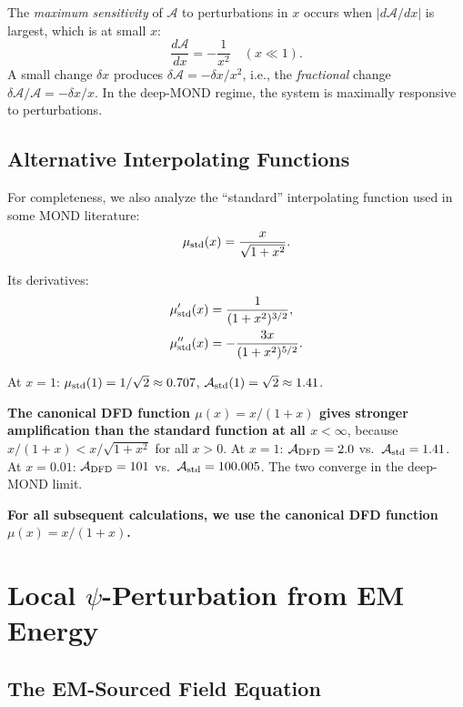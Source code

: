 \documentclass[aps,prd,twocolumn,superscriptaddress,nofootinbib]{revtex4-2}
\begin{document}
The \emph{maximum sensitivity} of $\mathcal{A}$ to perturbations in $x$
occurs when $|d\mathcal{A}/dx|$ is largest, which is at small $x$:
\begin{equation}
\frac{d\mathcal{A}}{dx} = -\frac{1}{x^2} \quad (x \ll 1).
\end{equation}
A small change $\delta x$ produces $\delta\mathcal{A} = -\delta x/x^2$,
i.e., the \emph{fractional} change $\delta\mathcal{A}/\mathcal{A} =
-\delta x/x$.  In the deep-MOND regime, the system is maximally
responsive to perturbations.

\subsection{Alternative Interpolating Functions}

For completeness, we also analyze the ``standard'' interpolating function
used in some MOND literature:
\begin{equation}
\mu_{\rm std}(x) = \frac{x}{\sqrt{1+x^2}}.
\end{equation}

Its derivatives:
\begin{align}
\mu_{\rm std}'(x) &= \frac{1}{(1+x^2)^{3/2}}, \\
\mu_{\rm std}''(x) &= -\frac{3x}{(1+x^2)^{5/2}}.
\end{align}

At $x = 1$: $\mu_{\rm std}(1) = 1/\sqrt{2} \approx 0.707$,
$\mathcal{A}_{\rm std}(1) = \sqrt{2} \approx 1.41$.

\textbf{The canonical DFD function $\mu(x) = x/(1+x)$ gives stronger
amplification than the standard function at all $x < \infty$}, because
$x/(1+x) < x/\sqrt{1+x^2}$ for all $x > 0$.  At $x = 1$:
$\mathcal{A}_{\rm DFD} = 2.0$ vs.\ $\mathcal{A}_{\rm std} = 1.41$.
At $x = 0.01$: $\mathcal{A}_{\rm DFD} = 101$ vs.\
$\mathcal{A}_{\rm std} = 100.005$.  The two converge in the deep-MOND limit.

\textbf{For all subsequent calculations, we use the canonical DFD function
$\mu(x) = x/(1+x)$.}


\section{Local $\psi$-Perturbation from EM Energy}\label{sec:psi-perturbation}

\subsection{The EM-Sourced Field Equation}
\end{document}
